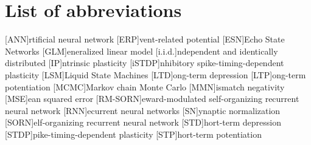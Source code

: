 \section*{List of abbreviations}
\begin{acronym}[RM-SORN]
[ANN]{rtificial neural network}
[ERP]{vent-related potential}
[ESN]{Echo State Networks}
[GLM]{eneralized linear model}
[i.i.d.]{ndependent and identically distributed}
[IP]{ntrinsic plasticity}
[iSTDP]{nhibitory spike-timing-dependent plasticity}
[LSM]{Liquid State Machines}
[LTD]{ong-term depression}
[LTP]{ong-term potentiation}
[MCMC]{Markov chain Monte Carlo}
[MMN]{ismatch negativity}
[MSE]{ean squared error}
[RM-SORN]{eward-modulated self-organizing recurrent neural network}
[RNN]{ecurrent neural networks}
[SN]{ynaptic normalization}
[SORN]{elf-organizing recurrent neural network}
[STD]{hort-term depression}
[STDP]{pike-timing-dependent plasticity}
[STP]{hort-term potentiation}
\end{acronym}
